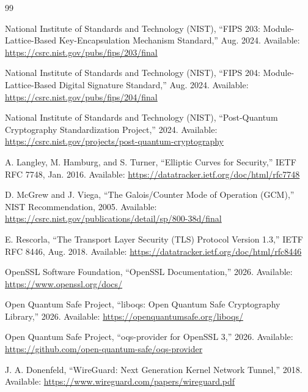 \thispagestyle{plain}

\begin{thebibliography}{99}


National Institute of Standards and Technology (NIST), 
``FIPS 203: Module-Lattice-Based Key-Encapsulation Mechanism Standard,'' 
Aug. 2024. Available: \url{https://csrc.nist.gov/pubs/fips/203/final}

National Institute of Standards and Technology (NIST), 
``FIPS 204: Module-Lattice-Based Digital Signature Standard,'' 
Aug. 2024. Available: \url{https://csrc.nist.gov/pubs/fips/204/final}

National Institute of Standards and Technology (NIST), 
``Post-Quantum Cryptography Standardization Project,'' 
2024. Available: \url{https://csrc.nist.gov/projects/post-quantum-cryptography}


A. Langley, M. Hamburg, and S. Turner, 
``Elliptic Curves for Security,'' 
IETF RFC 7748, Jan. 2016. Available: \url{https://datatracker.ietf.org/doc/html/rfc7748}

D. McGrew and J. Viega, 
``The Galois/Counter Mode of Operation (GCM),'' 
NIST Recommendation, 2005. Available: \url{https://csrc.nist.gov/publications/detail/sp/800-38d/final}

E. Rescorla, 
``The Transport Layer Security (TLS) Protocol Version 1.3,'' 
IETF RFC 8446, Aug. 2018. Available: \url{https://datatracker.ietf.org/doc/html/rfc8446}


OpenSSL Software Foundation, 
``OpenSSL Documentation,'' 
2026. Available: \url{https://www.openssl.org/docs/}

Open Quantum Safe Project, 
``liboqs: Open Quantum Safe Cryptography Library,'' 
2026. Available: \url{https://openquantumsafe.org/liboqs/}

Open Quantum Safe Project, 
``oqs-provider for OpenSSL 3,'' 
2026. Available: \url{https://github.com/open-quantum-safe/oqs-provider}


J. A. Donenfeld, 
``WireGuard: Next Generation Kernel Network Tunnel,'' 
2018. Available: \url{https://www.wireguard.com/papers/wireguard.pdf}


\end{thebibliography}
